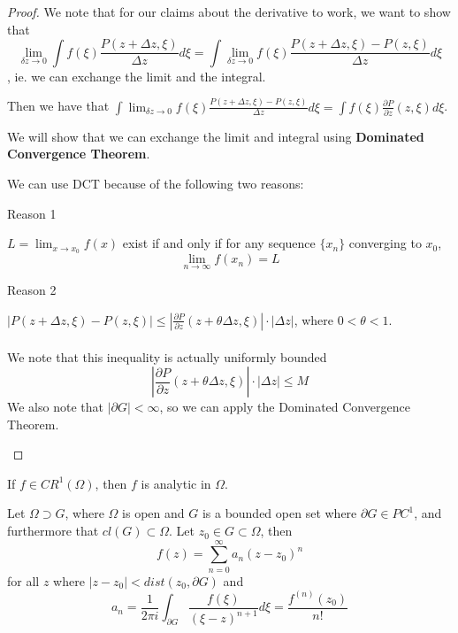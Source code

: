 \begin{proof}

We note that for our claims about the derivative to work, we want to show that
$$\lim_{\delta z \to 0} \int f(\xi) \frac{P(z + \Delta z, \xi)}{\Delta z} d\xi = \int \lim_{\delta z \to 0} f(\xi) \frac{P(z + \Delta z, \xi) - P(z, \xi)}{\Delta z} d\xi$$
, ie. we can exchange the limit and the integral.

Then we have that
$\int \lim_{\delta z \to 0} f(\xi) \frac{P(z + \Delta z, \xi) - P(z, \xi)}{\Delta z} d\xi = \int f(\xi) \frac{\partial P}{\partial z}(z, \xi) d\xi$.

We will show that we can exchange the limit and integral using \textbf{Dominated Convergence Theorem}.

We can use DCT because of the following two reasons:

Reason 1
\begin{lemma}
$L = \lim_{x \to x_0} f(x)$ exist if and only if for any sequence $\{x_n\}$ converging to $x_0$, 
\[\lim_{n \to \infty} f(x_n) = L\]
\end{lemma}

Reason 2
\begin{theorem}
$|P(z + \Delta z, \xi) - P(z, \xi)| \leq |\frac{\partial P}{\partial z}(z + \theta \Delta z, \xi)| \cdot |\Delta z|$, where $0 < \theta < 1$.\\\\
We note that this inequality is actually uniformly bounded
\[|\frac{\partial P}{\partial z}(z + \theta \Delta z, \xi)| \cdot |\Delta z| \leq M\]
We also note that $|\partial G| < \infty$, so we can apply the Dominated Convergence Theorem.
\end{theorem}
\end{proof}

\begin{theorem}
If $f \in CR^1(\Omega)$, then $f$ is analytic in $\Omega$.
\end{theorem}

\begin{theorem}
Let $\Omega \supset G$, where $\Omega$ is open and $G$ is a bounded open set where $\partial G \in PC^1$, and furthermore that $cl(G) \subset \Omega$. Let $z_0 \in G \subset \Omega$, then
$$f(z) = \sum_{n = 0}^\infty a_n (z - z_0)^n$$ for all $z$ where $|z - z_0| < dist(z_0, \partial G)$ and
\[a_n = \frac{1}{2\pi i} \int_{\partial G} \frac{f(\xi)}{(\xi - z)^{n+1}} d\xi = \frac{f^{(n)}(z_0)}{n!}\]
\end{theorem}

